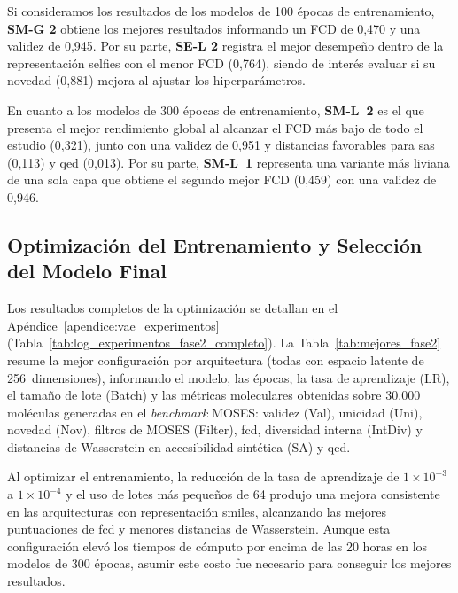 

Si consideramos los resultados de los modelos de 100 épocas de entrenamiento, \textbf{SM-G 2} obtiene los mejores resultados informando un FCD de 0,470 y una validez de 0,945. Por su parte, \textbf{SE-L 2} registra el mejor desempeño dentro de la representación \gls{selfies} con el menor FCD (0,764), siendo de interés evaluar si su novedad (0,881) mejora al ajustar los hiperparámetros.

En cuanto a los modelos de 300 épocas de entrenamiento, \textbf{SM-L~2} es el que presenta el mejor rendimiento global al alcanzar el FCD más bajo de todo el estudio (0,321), junto con una validez de 0,951 y distancias favorables para \gls{sas} (0,113) y \gls{qed} (0,013). Por su parte, \textbf{SM-L~1} representa una variante más liviana de una sola capa que obtiene el segundo mejor FCD (0,459) con una validez de 0,946.



\subsection{Optimización del Entrenamiento y Selección del Modelo Final}
\label{subsec:res_vae_fase2}

Los resultados completos de la optimización se detallan en el Apéndice~\ref{apendice:vae_experimentos} (Tabla~\ref{tab:log_experimentos_fase2_completo}). La Tabla~\ref{tab:mejores_fase2} resume la mejor configuración por arquitectura (todas con espacio latente de 256~dimensiones), informando el modelo, las épocas, la tasa de aprendizaje (LR), el tamaño de lote (Batch) y las métricas moleculares obtenidas sobre 30.000 moléculas generadas en el \textit{benchmark} MOSES: validez (Val), unicidad (Uni), novedad (Nov), filtros de MOSES (Filter), \acrshort{fcd}, diversidad interna (IntDiv) y distancias de Wasserstein en accesibilidad sintética (SA) y \gls{qed}.



Al optimizar el entrenamiento, la reducción de la tasa de aprendizaje de $1 \times 10^{-3}$ a $1 \times 10^{-4}$ y el uso de lotes más pequeños de 64 produjo una mejora consistente en las arquitecturas con representación \gls{smiles}, alcanzando las mejores puntuaciones de \gls{fcd} y menores distancias de Wasserstein. Aunque esta configuración elevó los tiempos de cómputo por encima de las 20 horas en los modelos de 300 épocas, asumir este costo fue necesario para conseguir los mejores resultados.

